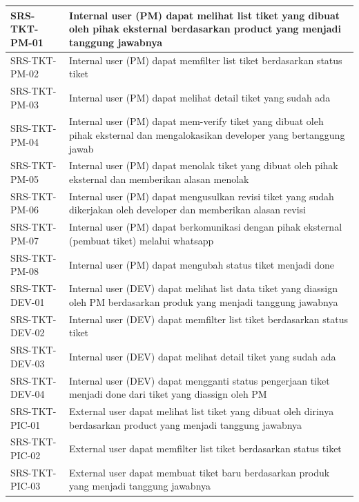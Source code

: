 \documentclass[12pt]{article}
\begin{document}
\begin{enumerate}[label=\textbf{4.\arabic*.}]
\begin{enumerate}[label=\textbf{4.1.\arabic*.}, wide, labelwidth=!, labelindent=0pt]
\begin{longtable}{|l|p{}|}
            SRS-TKT-PM-01 & Internal user (PM) dapat melihat list tiket yang dibuat oleh pihak eksternal berdasarkan product yang menjadi tanggung jawabnya \\
            \hline
            SRS-TKT-PM-02 & Internal user (PM) dapat memfilter list tiket berdasarkan status tiket \\
            \hline
            SRS-TKT-PM-03 & Internal user (PM) dapat melihat detail tiket yang sudah ada \\
            \hline
            SRS-TKT-PM-04 & Internal user (PM) dapat mem-verify tiket yang dibuat oleh pihak eksternal dan mengalokasikan developer yang bertanggung jawab \\
            \hline
            SRS-TKT-PM-05 & Internal user (PM) dapat menolak tiket yang dibuat oleh pihak eksternal dan memberikan alasan menolak \\
            \hline
            SRS-TKT-PM-06 & Internal user (PM) dapat mengusulkan revisi tiket yang sudah dikerjakan oleh developer dan memberikan alasan revisi \\
            \hline
            SRS-TKT-PM-07 & Internal user (PM) dapat berkomunikasi dengan pihak eksternal (pembuat tiket) melalui whatsapp \\
            \hline
            SRS-TKT-PM-08 & Internal user (PM) dapat mengubah status tiket menjadi done \\
            \hline
            SRS-TKT-DEV-01 & Internal user (DEV) dapat melihat list data tiket yang diassign oleh PM berdasarkan produk yang menjadi tanggung jawabnya \\
            \hline
            SRS-TKT-DEV-02 & Internal user (DEV) dapat memfilter list tiket berdasarkan status tiket \\
            \hline
            SRS-TKT-DEV-03 & Internal user (DEV) dapat melihat detail tiket yang sudah ada \\
            \hline
            SRS-TKT-DEV-04 & Internal user (DEV) dapat mengganti status pengerjaan tiket menjadi done dari tiket yang diassign oleh PM \\
            \hline
            SRS-TKT-PIC-01 & External user dapat melihat list tiket yang dibuat oleh dirinya berdasarkan product yang menjadi tanggung jawabnya \\
            \hline
            SRS-TKT-PIC-02 & External user dapat memfilter list tiket berdasarkan status tiket \\
            \hline
            SRS-TKT-PIC-03 & External user dapat membuat tiket baru berdasarkan produk yang menjadi tanggung jawabnya \\

\end{longtable}
\end{enumerate}
\end{enumerate}
\end{document}
